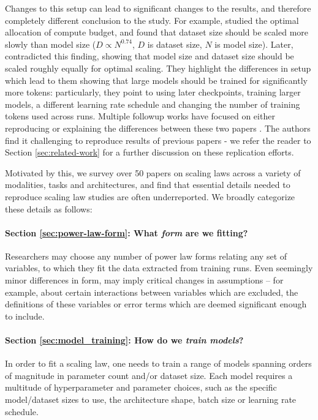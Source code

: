 Changes to this setup can lead to significant changes to the results, and therefore completely different conclusion to the study. For example, \citet{kaplan2020scaling} studied the optimal allocation of compute budget, and found that dataset size should be scaled more slowly than model size ($D \propto N^{0.74}$, $D$ is dataset size, $N$ is model size). Later, \citet{hoffmann2022training} contradicted this finding, showing that model size and dataset size should be scaled roughly equally for optimal scaling. They highlight the differences in setup which lead to them showing that large models should be trained for significantly more tokens: particularly, they point to using later checkpoints, training larger models, a different learning rate schedule and changing the number of training tokens used across runs. Multiple followup works have focused on either reproducing or explaining the differences between these two papers \citep{besiroglu2024chinchilla,porian2024resolving, pearce2024reconcilingkaplanchinchillascaling}. The authors find it challenging to reproduce results of previous papers - we refer the reader to Section \ref{sec:related-work} for a further discussion on these replication efforts.

Motivated by this, we survey over 50 papers on scaling laws across a variety of modalities, tasks and architectures, and find that essential details needed to reproduce scaling law studies are often underreported. We broadly categorize these details as follows:

\paragraph{Section \ref{sec:power-law-form}: What \textit{form} are we fitting?} Researchers may choose any number of power law forms relating any set of variables, to which they fit the data extracted from training runs. Even seemingly minor differences in form, may imply critical changes in assumptions -- for example, about certain interactions between variables which are excluded, the definitions of these variables or error terms which are deemed significant enough to include.
\vspace{-5mm}
\paragraph{Section \ref{sec:model_training}: How do we \textit{train models}?} In order to fit a scaling law, one needs to train a range of models spanning orders of magnitude in parameter count and/or dataset size. Each model requires a multitude of hyperparameter and parameter choices, such as the specific model/dataset sizes to use, the architecture shape, batch size or learning rate schedule.
\vspace{-5mm}

